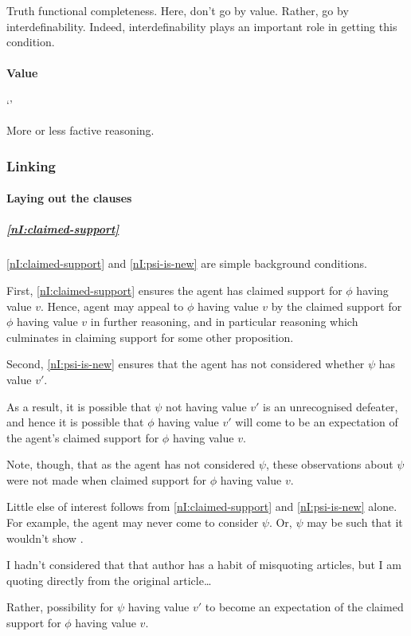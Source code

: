 \begin{note}
  \color{red}
  Truth functional completeness.
  Here, don't go by value.
  Rather, go by interdefinability.
  Indeed, interdefinability plays an important role in getting this condition.
\end{note}

\paragraph{Value}

\begin{note}
  `\RBV{-}'

  More or less factive reasoning.
\end{note}

\subsubsection{Linking}
\label{sec:nI:arg:linking}

\paragraph{Laying out the clauses}

\subparagraph{\ref{nI:claimed-support}}

\begin{note}
\ref{nI:claimed-support} and \ref{nI:psi-is-new} are simple background conditions.

First, \ref{nI:claimed-support} ensures the agent has claimed support for \(\phi\) having value \(v\).
Hence, agent may appeal to \(\phi\) having value \(v\) by the claimed support for \(\phi\) having value \(v\) in further reasoning, and in particular reasoning which culminates in claiming support for some other proposition.

Second, \ref{nI:psi-is-new} ensures that the agent has not considered whether \(\psi\) has value \(v'\).

As a result, it is possible that \(\psi\) not having value \(v'\) is an unrecognised defeater, and hence it is possible that \(\phi\) having value \(v'\) will come to be an expectation of the agent's claimed support for \(\phi\) having value \(v\).

Note, though, that as the agent has not considered \(\psi\), these observations about \(\psi\) were not made when claimed support for \(\phi\) having value \(v\).

Little else of interest follows from \ref{nI:claimed-support} and \ref{nI:psi-is-new} alone.
For example, the agent may never come to consider \(\psi\).
Or, \(\psi\) may be such that it wouldn't show \mom{}.

I hadn't considered that that author has a habit of misquoting articles, but I am quoting directly from the original article\dots

Rather, possibility for \(\psi\) having value \(v'\) to become an expectation of the claimed support for \(\phi\) having value \(v\).
\end{note}


